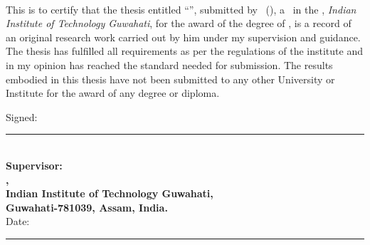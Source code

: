 \documentclass[11pt, a4paper, twoside]{Thesis} %
\begin{document}
\clearpage %

\pagestyle{empty} %

\begin{titlepage}
\begin{center}
\textsc{\textbf{\fontsize{31}{32}\selectfont{Certificate}}}\\[2.0cm] %
\end{center}

 \vspace{0.5cm}

This is to certify that the thesis entitled ``\textbf{\thesisTitle}'',
submitted by \authorName \ (\enrollmentNumber), a \studentType \ in the \textit{\departmentName},
\textit{Indian Institute of Technology Guwahati}, for the award of the degree of \degreeName, is a
record of an original research work carried out by him under my supervision
and guidance. The thesis has fulfilled all requirements as per the
regulations of the institute and in my opinion has reached the standard
needed for submission. The results embodied in this thesis have not
been submitted to any other University or Institute for the award
of any degree or diploma.

\vspace{3cm}
Signed:\\ \rule[1em]{25em}{0.5pt}\\[0.1cm] %
\textbf{Supervisor: \supervisorTitle \ \supervisorName}\\
\textbf{\departmentName,}\\
\textbf{Indian Institute of Technology Guwahati,}\\
\textbf{Guwahati-781039, Assam, India.}\\[2cm] \hfill{}Date:\\ \rule[1em]{25em}{0.5pt} %

\end{titlepage}


\begin{titlepage}
\begin{center}
\textsc{\textbf{\fontsize{31}{32}\selectfont{Acknowledgements}}}\\[1.0cm] %
\end{center}

  

\end{titlepage}
\end{document}
